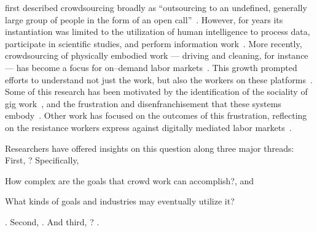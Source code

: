\documentclass[trackingWork]{subfiles}
\begin{document}
\citeauthor{howe2008crowdsourcing} first described crowdsourcing broadly as
``outsourcing to an undefined, generally large group of people in the form of an open call''~\cite{howe2008crowdsourcing}.
However, for years its instantiation was limited to the utilization of
human intelligence to process data, participate in scientific studies, and perform information work~\cite{CrowdsourcingUserStudies,movieSummarizationWu,yuenSurvey,geiger2011managing,quinnbedersonTaxonomy}.
More recently, crowdsourcing of physically embodied work
--- driving and cleaning, for instance ---
has become a focus for on--demand labor markets~\cite{uberAlgorithm,uberOfficial,zaarlyOfficial,taskrabbitOfficial}.
This growth prompted efforts to understand not just the work, but also the workers on these platforms~\cite{Ross,whoareNOTtheTurkers}.
Some of this research has been motivated by the identification of the sociality of gig work~\cite{crowdcollab},
and the frustration and disenfranchisement that these systems embody~\cite{turkopticon,martin2014being,takingAHITMcInnis}.
Other work has focused on the outcomes of this frustration,
reflecting on the resistance workers express against digitally mediated labor markets~\cite{uberAlgorithm,dynamo}.

Researchers have offered insights on this question along three major threads:
First, ?
      Specifically,
      \begin{inlinelist}[label=(\alph*)]
        \item How complex are the goals that crowd work can accomplish?, and
        \item What kinds of goals and industries may eventually utilize it?
      \end{inlinelist}
      \cite{foundry,suzukiAtelier,KimStoria,yuanAlmost,YuEncouragingOutside,
            Nebeling:2016:WCW:2858036.2858169,
            Hahn:2016:KAB:2858036.2858364}.
Second, 
      \cite{embracingErrorKrishna,bernsteinSoylent,sensitiveTasks,
            LykourentzouPersonalityMatters,KucherbaevReLauncher,
            Law:2016:CKC:2858036.2858144,Cai:2016:CRI:2858036.2858237,
            Chang:2016:ACC:2858036.2858411,Newell:2016:OMA:2858036.2858490}.
And third, ?
      \cite{turkopticon,storiesIraniSilberman,dynamo,crowdcollab,
            whyWouldAnyoneBrewer,takingAHITMcInnis}.
\end{document}
